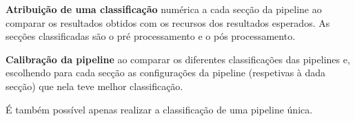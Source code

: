 \textbf{Atribuição de uma classificação} numérica a cada secção da pipeline ao comparar os resultados obtidos com os recursos dos resultados esperados. As secções classificadas são o pré processamento e o pós processamento.

\textbf{Calibração da pipeline} ao comparar os diferentes classificações das pipelines e, escolhendo para cada secção as configurações da pipeline (respetivas à dada secção) que nela teve melhor classificação.

É também possível apenas realizar a classificação de uma pipeline única.











